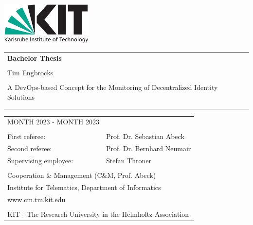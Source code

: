 \begin{titlepage}
\thispagestyle{empty}
\enlargethispage{2cm}

\sffamily
\vspace*{-3.2cm}
\hspace*{-0.6cm}
\includegraphics[height=2.14cm]{figures/kit-logo.png}

\begin{addmargin}{4cm}

\vfill

\begin{tabular}{p{12cm}}
	{\bfseries\huge Bachelor Thesis}\\
	\\
	{Tim Engbrocks} \vspace{2em} \\
	\\
	{\linespread{0.85}\selectfont \Huge A DevOps-based Concept for the Monitoring of Decentralized Identity Solutions\par}   \vspace{0.5em}\\
	{\LARGE } \vspace{0.5em} \\
	{\LARGE }
\end{tabular}
\vfill
\vfill
\vfill



\vspace{1em}
\begin{tabular}{ll}
	
        
	MONTH 2023 - MONTH 2023 \\
	\\
	First referee: 				& Prof. Dr. Sebastian Abeck \\
	Second referee:				& Prof. Dr. Bernhard Neumair \\
	Supervising employee:		& Stefan Throner \\
	\\
	\multicolumn{2}{l}{Cooperation \& Management (C\&M, Prof. Abeck)} \\
	\multicolumn{2}{l}{Institute for Telematics, Department of Informatics} \\
	\multicolumn{2}{l}{www.cm.tm.kit.edu} \\
	\\
	\multicolumn{2}{l}{\scriptsize{KIT - The Research University in the Helmholtz Association}}\\
\end{tabular}

\end{addmargin}
\newpage
\thispagestyle{empty}
\end{titlepage}